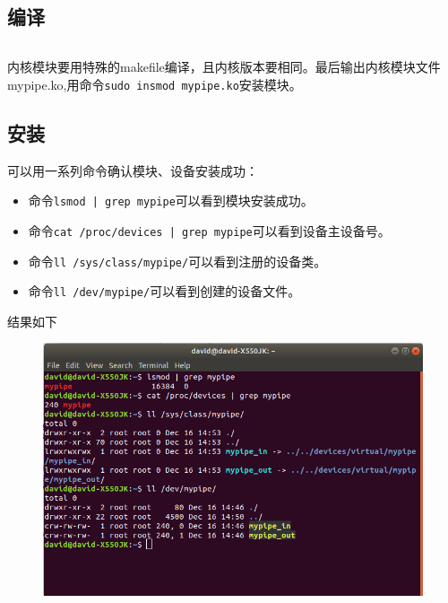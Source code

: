 \documentclass{article}
\begin{document}
\subsection{编译}
\inputminted[label=Makefile,linenos=true,breaklines=true,bgcolor=bg,frame=lines,fontsize=\footnotesize]{makefile}{Makefile}
内核模块要用特殊的makefile编译，且内核版本要相同。最后输出内核模块文件mypipe.ko,用命令\texttt{sudo insmod mypipe.ko}安装模块。

\subsection{安装}
可以用一系列命令确认模块、设备安装成功：
\begin{itemize}
    \item 命令\texttt{lsmod | grep mypipe}可以看到模块安装成功。
    \item 命令\texttt{cat /proc/devices | grep mypipe}可以看到设备主设备号。
    \item 命令\texttt{ll /sys/class/mypipe/}可以看到注册的设备类。
    \item 命令\texttt{ll /dev/mypipe/}可以看到创建的设备文件。
\end{itemize}
结果如下
\begin{figure}[H]
\centering
\includegraphics[width=\linewidth]{sh_success.png}
\end{figure}
\end{document}
